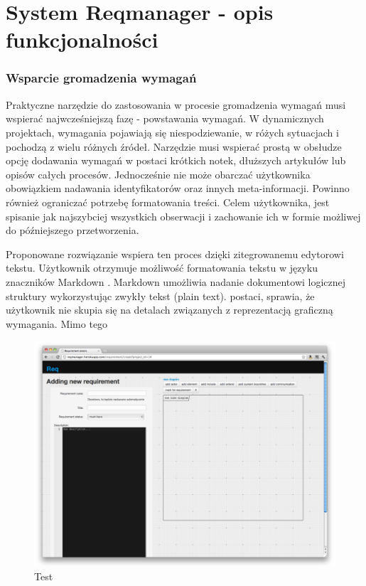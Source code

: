   \section{System Reqmanager - opis funkcjonalności}

    \subsubsection{Wsparcie gromadzenia wymagań}
      Praktyczne narzędzie do zastosowania w procesie gromadzenia wymagań musi wspierać najwcześniejszą fazę - powstawania wymagań. W dynamicznych projektach, wymagania pojawiają się niespodziewanie, w różych sytuacjach i pochodzą z wielu różnych źródeł. Narzędzie musi wspierać prostą w obsłudze opcję dodawania wymagań w postaci krótkich notek, dłuższych artykułów lub opisów całych procesów. Jednocześnie nie może obarczać użytkownika obowiązkiem nadawania identyfikatorów oraz innych meta-informacji. Powinno również ograniczać potrzebę formatowania treści. Celem użytkownika, jest spisanie jak najszybciej wszystkich obserwacji i zachowanie ich w formie możliwej do późniejszego przetworzenia.

      Proponowane rozwiązanie wspiera ten proces dzięki zitegrowanemu edytorowi tekstu. Użytkownik otrzymuje możliwość formatowania tekstu w języku znaczników Markdown \cite{Grub04}. Markdown umożliwia nadanie dokumentowi logicznej struktury wykorzystując zwykły tekst (plain text). postaci, sprawia, że użytkownik nie skupia się na detalach związanych z reprezentacją graficzną wymagania. Mimo tego 

      \begin{figure}[t]
        \centering
        \includegraphics[width=1.0\textwidth]{screen_test.pdf}
        \caption{Test}
      \end{figure}


